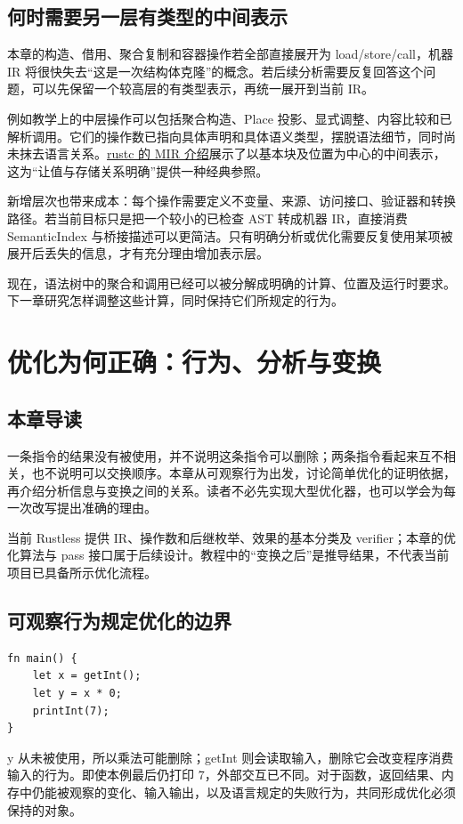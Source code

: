 \section{何时需要另一层有类型的中间表示}
本章的构造、借用、聚合复制和容器操作若全部直接展开为 load/store/call，机器 IR 将很快失去“这是一次结构体克隆”的概念。若后续分析需要反复回答这个问题，可以先保留一个较高层的有类型表示，再统一展开到当前 IR。

例如教学上的中层操作可以包括聚合构造、Place 投影、显式调整、内容比较和已解析调用。它们的操作数已指向具体声明和具体语义类型，摆脱语法细节，同时尚未抹去语言关系。\href{https://rustc-dev-guide.rust-lang.org/mir/index.html}{rustc 的 MIR 介绍}展示了以基本块及位置为中心的中间表示，这为“让值与存储关系明确”提供一种经典参照。

新增层次也带来成本：每个操作需要定义不变量、来源、访问接口、验证器和转换路径。若当前目标只是把一个较小的已检查 AST 转成机器 IR，直接消费 SemanticIndex 与桥接描述可以更简洁。只有明确分析或优化需要反复使用某项被展开后丢失的信息，才有充分理由增加表示层。

现在，语法树中的聚合和调用已经可以被分解成明确的计算、位置及运行时要求。下一章研究怎样调整这些计算，同时保持它们所规定的行为。

\chapter{优化为何正确：行为、分析与变换}
\label{chap:optimization}
\section*{本章导读}
一条指令的结果没有被使用，并不说明这条指令可以删除；两条指令看起来互不相关，也不说明可以交换顺序。本章从可观察行为出发，讨论简单优化的证明依据，再介绍分析信息与变换之间的关系。读者不必先实现大型优化器，也可以学会为每一次改写提出准确的理由。

当前 Rustless 提供 IR、操作数和后继枚举、效果的基本分类及 verifier；本章的优化算法与 pass 接口属于后续设计。教程中的“变换之后”是推导结果，不代表当前项目已具备所示优化流程。

\section{可观察行为规定优化的边界}
\begin{lstlisting}[language=Rustless,caption={没有使用的结果与必须发生的输入行为}]
fn main() {
    let x = getInt();
    let y = x * 0;
    printInt(7);
}
\end{lstlisting}
y 从未被使用，所以乘法可能删除；getInt 则会读取输入，删除它会改变程序消费输入的行为。即使本例最后仍打印 7，外部交互已不同。对于函数，返回结果、内存中仍能被观察的变化、输入输出，以及语言规定的失败行为，共同形成优化必须保持的对象。

